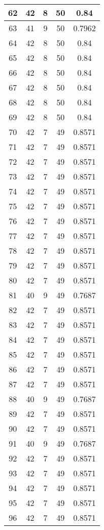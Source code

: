 \documentclass[letterpaper, 12pt]{article}
\begin{document}
\begin{longtable}{|c|c|c|c|c|}
\hline
62 & 42 & 8 & 50 & 0.84 \\
\hline
63 & 41 & 9 & 50 & 0.7962 \\
\hline
64 & 42 & 8 & 50 & 0.84 \\
\hline
65 & 42 & 8 & 50 & 0.84 \\
\hline
66 & 42 & 8 & 50 & 0.84 \\
\hline
67 & 42 & 8 & 50 & 0.84 \\
\hline
68 & 42 & 8 & 50 & 0.84 \\
\hline
69 & 42 & 8 & 50 & 0.84 \\
\hline
70 & 42 & 7 & 49 & 0.8571 \\
\hline
71 & 42 & 7 & 49 & 0.8571 \\
\hline
72 & 42 & 7 & 49 & 0.8571 \\
\hline
73 & 42 & 7 & 49 & 0.8571 \\
\hline
74 & 42 & 7 & 49 & 0.8571 \\
\hline
75 & 42 & 7 & 49 & 0.8571 \\
\hline
76 & 42 & 7 & 49 & 0.8571 \\
\hline
77 & 42 & 7 & 49 & 0.8571 \\
\hline
78 & 42 & 7 & 49 & 0.8571 \\
\hline
79 & 42 & 7 & 49 & 0.8571 \\
\hline
80 & 42 & 7 & 49 & 0.8571 \\
\hline
81 & 40 & 9 & 49 & 0.7687 \\
\hline
82 & 42 & 7 & 49 & 0.8571 \\
\hline
83 & 42 & 7 & 49 & 0.8571 \\
\hline
84 & 42 & 7 & 49 & 0.8571 \\
\hline
85 & 42 & 7 & 49 & 0.8571 \\
\hline
86 & 42 & 7 & 49 & 0.8571 \\
\hline
87 & 42 & 7 & 49 & 0.8571 \\
\hline
88 & 40 & 9 & 49 & 0.7687 \\
\hline
89 & 42 & 7 & 49 & 0.8571 \\
\hline
90 & 42 & 7 & 49 & 0.8571 \\
\hline
91 & 40 & 9 & 49 & 0.7687 \\
\hline
92 & 42 & 7 & 49 & 0.8571 \\
\hline
93 & 42 & 7 & 49 & 0.8571 \\
\hline
94 & 42 & 7 & 49 & 0.8571 \\
\hline
95 & 42 & 7 & 49 & 0.8571 \\
\hline
96 & 42 & 7 & 49 & 0.8571 \\

\end{longtable}
\end{document}
